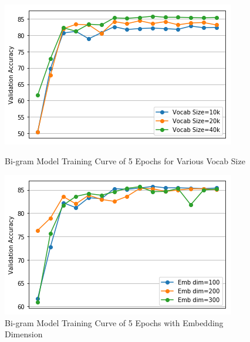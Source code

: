 \documentclass[10pt]{article}
\begin{document}
\begin{figure}[h]
\centering
\begin{minipage}{.4\textwidth}
  \includegraphics[width=\textwidth]{plot6}
  \caption{Bi-gram Model Training Curve of 5 Epochs for Various Vocab Size}
\end{minipage}%
\hfill
\begin{minipage}{.4\textwidth}
  \includegraphics[width=\textwidth]{plot7}
  \caption{Bi-gram Model Training Curve of 5 Epochs with Embedding Dimension}
\end{minipage}
\end{figure}
\end{document}
